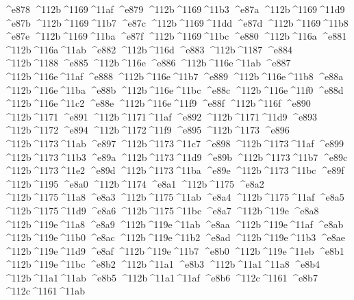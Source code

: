 \checkit ^^^^e878 ^^^^112b^^^^1169^^^^11af
\checkit ^^^^e879 ^^^^112b^^^^1169^^^^11b3
\checkit ^^^^e87a ^^^^112b^^^^1169^^^^11d9
\checkit ^^^^e87b ^^^^112b^^^^1169^^^^11b7
\checkit ^^^^e87c ^^^^112b^^^^1169^^^^11dd
\checkit ^^^^e87d ^^^^112b^^^^1169^^^^11b8
\checkit ^^^^e87e ^^^^112b^^^^1169^^^^11ba
\checkit ^^^^e87f ^^^^112b^^^^1169^^^^11bc
\checkit ^^^^e880 ^^^^112b^^^^116a
\checkit ^^^^e881 ^^^^112b^^^^116a^^^^11ab
\checkit ^^^^e882 ^^^^112b^^^^116d
\checkit ^^^^e883 ^^^^112b^^^^1187
\checkit ^^^^e884 ^^^^112b^^^^1188
\checkit ^^^^e885 ^^^^112b^^^^116e
\checkit ^^^^e886 ^^^^112b^^^^116e^^^^11ab
\checkit ^^^^e887 ^^^^112b^^^^116e^^^^11af
\checkit ^^^^e888 ^^^^112b^^^^116e^^^^11b7
\checkit ^^^^e889 ^^^^112b^^^^116e^^^^11b8
\checkit ^^^^e88a ^^^^112b^^^^116e^^^^11ba
\checkit ^^^^e88b ^^^^112b^^^^116e^^^^11bc
\checkit ^^^^e88c ^^^^112b^^^^116e^^^^11f0
\checkit ^^^^e88d ^^^^112b^^^^116e^^^^11c2
\checkit ^^^^e88e ^^^^112b^^^^116e^^^^11f9
\checkit ^^^^e88f ^^^^112b^^^^116f
\checkit ^^^^e890 ^^^^112b^^^^1171
\checkit ^^^^e891 ^^^^112b^^^^1171^^^^11af
\checkit ^^^^e892 ^^^^112b^^^^1171^^^^11d9
\checkit ^^^^e893 ^^^^112b^^^^1172
\checkit ^^^^e894 ^^^^112b^^^^1172^^^^11f9
\checkit ^^^^e895 ^^^^112b^^^^1173
\checkit ^^^^e896 ^^^^112b^^^^1173^^^^11ab
\checkit ^^^^e897 ^^^^112b^^^^1173^^^^11c7
\checkit ^^^^e898 ^^^^112b^^^^1173^^^^11af
\checkit ^^^^e899 ^^^^112b^^^^1173^^^^11b3
\checkit ^^^^e89a ^^^^112b^^^^1173^^^^11d9
\checkit ^^^^e89b ^^^^112b^^^^1173^^^^11b7
\checkit ^^^^e89c ^^^^112b^^^^1173^^^^11e2
\checkit ^^^^e89d ^^^^112b^^^^1173^^^^11ba
\checkit ^^^^e89e ^^^^112b^^^^1173^^^^11bc
\checkit ^^^^e89f ^^^^112b^^^^1195
\checkit ^^^^e8a0 ^^^^112b^^^^1174
\checkit ^^^^e8a1 ^^^^112b^^^^1175
\checkit ^^^^e8a2 ^^^^112b^^^^1175^^^^11a8
\checkit ^^^^e8a3 ^^^^112b^^^^1175^^^^11ab
\checkit ^^^^e8a4 ^^^^112b^^^^1175^^^^11af
\checkit ^^^^e8a5 ^^^^112b^^^^1175^^^^11d9
\checkit ^^^^e8a6 ^^^^112b^^^^1175^^^^11bc
\checkit ^^^^e8a7 ^^^^112b^^^^119e
\checkit ^^^^e8a8 ^^^^112b^^^^119e^^^^11a8
\checkit ^^^^e8a9 ^^^^112b^^^^119e^^^^11ab
\checkit ^^^^e8aa ^^^^112b^^^^119e^^^^11af
\checkit ^^^^e8ab ^^^^112b^^^^119e^^^^11b0
\checkit ^^^^e8ac ^^^^112b^^^^119e^^^^11b2
\checkit ^^^^e8ad ^^^^112b^^^^119e^^^^11b3
\checkit ^^^^e8ae ^^^^112b^^^^119e^^^^11d9
\checkit ^^^^e8af ^^^^112b^^^^119e^^^^11b7
\checkit ^^^^e8b0 ^^^^112b^^^^119e^^^^11eb
\checkit ^^^^e8b1 ^^^^112b^^^^119e^^^^11bc
\checkit ^^^^e8b2 ^^^^112b^^^^11a1
\checkit ^^^^e8b3 ^^^^112b^^^^11a1^^^^11a8
\checkit ^^^^e8b4 ^^^^112b^^^^11a1^^^^11ab
\checkit ^^^^e8b5 ^^^^112b^^^^11a1^^^^11af
\checkit ^^^^e8b6 ^^^^112c^^^^1161
\checkit ^^^^e8b7 ^^^^112c^^^^1161^^^^11ab
